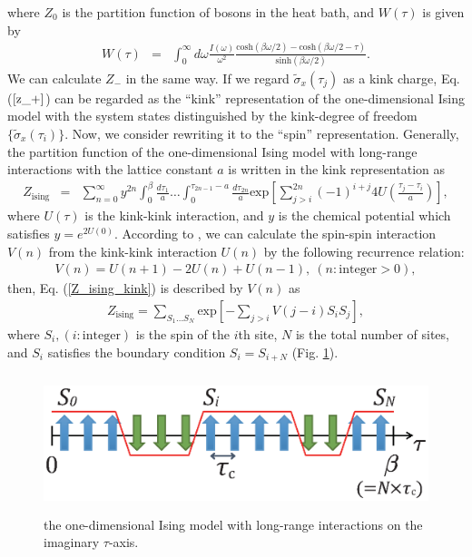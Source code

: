 where $Z _0$ is the partition function of  bosons in the heat bath,
and  $W(\tau)$ is given by 
\begin{eqnarray}
	W(\tau)&=&\int_{0}^{\infty}d\omega \frac{I(\omega)}{\omega^2}
	\frac{\mathrm{cosh}(\beta\omega/2)-\mathrm{cosh}(\beta\omega/2-\tau)}{\mathrm{sinh}(\beta\omega/2)}.
	\label{kink_interaction}
\end{eqnarray}
We can calculate  $Z_{-}$ in the same way.
%
If we regard $\tilde{\sigma}_x(\tau_{j})$ as a kink charge, 
Eq. ($\ref{z_+}$) can be regarded as the ``kink'' representation of the one-dimensional Ising model with the  system states distinguished by the kink-degree of freedom $\{ \tilde{\sigma}_x(\tau_i)\}$.
Now, we consider rewriting it to the ``spin'' representation.
Generally, the partition function of  the one-dimensional Ising model with long-range interactions with the lattice constant $a$ 
is written in the kink representation as 
\begin{eqnarray}
	Z_{\mathrm{ising}}&=&\sum_{n=0}^{\infty}y^{2n}\int_{0}^{\beta}\frac{d\tau_1}{a} \ldots \int_{0}^{\tau_{2n-1}-a} \frac{d\tau_{2n}}{a}
	\mathrm{exp}\left[\sum_{j>i}^{2n}(-1)^{i+j}4U\left(\frac{\tau_j-\tau_i}{a}\right)\right],
	\label{Z_ising_kink}
\end{eqnarray}
where $U(\tau)$ is the kink-kink interaction, and $y$ is the chemical potential which satisfies $y=e^{2U(0)}$.
According to \cite{Volker98,Cardy81}, we can calculate the spin-spin interaction $V(n)$ from the kink-kink interaction $U(n)$ by the following recurrence relation:
\begin{eqnarray}
	V(n)=U(n+1)-2U(n)+U(n-1),\ (n:\mathrm{integer}>0),
	\label{V}
\end{eqnarray}
then, Eq. (\ref{Z_ising_kink}) is described by $V(n)$ as 
\begin{eqnarray}
	Z_{\mathrm{ising}}=\sum_{S_1 \ldots S_N}\mathrm{exp}\left[-\sum_{j>i}V(j-i)S_iS_j\right],
	\label{Z_ising_spin}
\end{eqnarray}
where $S_i,(i:\mathrm{integer})$ is the spin of the $i$th site, $N$ is the total number of sites, and $S_{i}$
satisfies the boundary condition $S_{i}=S_{i+N}$ (Fig. \ref{fig:ising_model}).
\begin{figure}[tb]
	\centering
	\includegraphics[height=4.0cm]{ising_model.eps}
	\caption{
	 the one-dimensional Ising model with long-range interactions on the imaginary $\tau$-axis.
	}
	\label{fig:ising_model}
\end{figure}

